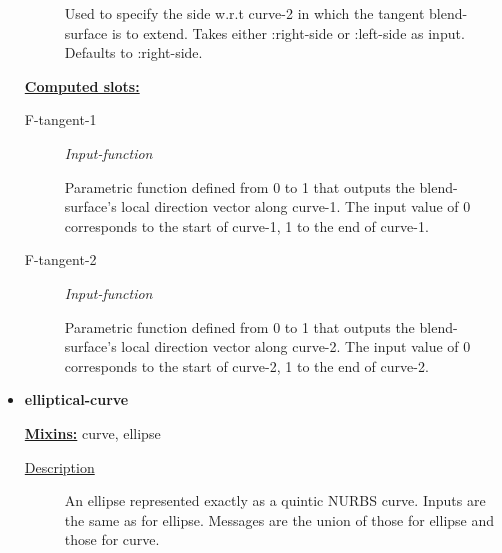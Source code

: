 \documentclass [11pt]{book}
\begin{document}
\begin{itemize}
\begin{description}
 Used to specify the side w.r.t curve-2 in which the tangent blend-surface is to extend. Takes either :right-side or :left-side as input. Defaults to :right-side.




\end{description}






\textbf{
\underline{Computed slots:}}

\begin{description}

\item [F-tangent-1]
\emph{Input-function}

 Parametric function defined from 0 to 1 that outputs the blend-surface's local direction vector along curve-1. The input value of 0 corresponds to the start of curve-1, 1 to the end of curve-1.




\item [F-tangent-2]
\emph{Input-function}

 Parametric function defined from 0 to 1 that outputs the blend-surface's local direction vector along curve-2. The input value of 0 corresponds to the start of curve-2, 1 to the end of curve-2.




\end{description}







\item {}
\label{prim:elliptical-curve}
\textbf{elliptical-curve}


\textbf{
\underline{Mixins:}} curve, ellipse





\begin{description}

\item [
\underline{Description}]


An ellipse represented exactly as a quintic NURBS curve. Inputs are the same as for ellipse. 
Messages are the union of those for ellipse and those for curve.



\end{description}





\end{itemize}
\end{document}
